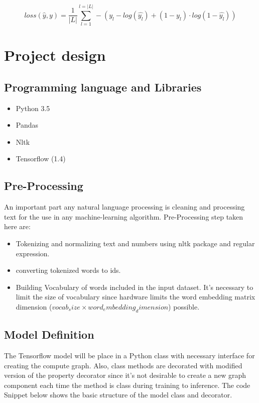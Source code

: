 \documentclass{article}
\begin{document}
\begin{equation}
        loss(\hat{y}, y) = \frac{1}{|L|} \sum_{l=1}^{l=|L|} - (y_l - log(\hat{y_l}) + (1-y_l) \cdot log(1-\hat{y_l}))
\end{equation}


\section{Project design}

\subsection{Programming language and Libraries}

\begin{itemize}
        \item Python 3.5
        \item Pandas
        \item Nltk
        \item Tensorflow (1.4)
\end{itemize}


\subsection{Pre-Processing}

An important part any natural language processing is cleaning and processing text for the use in any machine-learning algorithm. Pre-Processing step taken here are:

\begin{itemize}

        \item Tokenizing and normalizing text and numbers using nltk package and regular expression.
        \item converting tokenized words to ids.
        \item Building Vocabulary of words included in the input dataset. It's necessary to limit the size of vocabulary since hardware limits the word embedding matrix dimension ($vocab_size \times word_embedding_dimension$) possible.

\end{itemize}

\subsection{Model Definition}

The Tensorflow model will be place in a Python class with necessary interface for creating the compute graph. Also, class methods are decorated with modified version of the property decorator since it's not desirable to create a new graph component each time the method is class during training to inference. The code Snippet below shows the basic structure of the model class and decorator.
\end{document}
